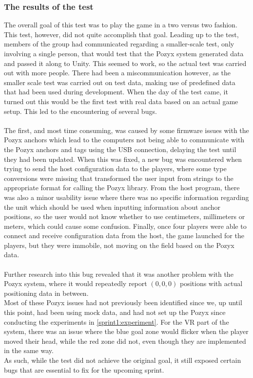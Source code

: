 \subsubsection{The results of the test}
The overall goal of this test was to play the game in a two versus two fashion.
This test, however, did not quite accomplish that goal.
Leading up to the test, members of the group had communicated regarding a smaller-scale test, only involving a single person, that would test that the Pozyx system generated data and passed it along to Unity.
This seemed to work, so the actual test was carried out with more people.
There had been a miscommunication however, as the smaller scale test was carried out on test data, making use of predefined data that had been used during development.
When the day of the test came, it turned out this would be the first test with real data based on an actual game setup.
This led to the encountering of several bugs.
\\\\
The first, and most time consuming, was caused by some firmware issues with the Pozyx anchors which lead to the computers not being able to communicate with the Pozyx anchors and tags using the USB connection, delaying the test until they had been updated.
When this was fixed, a new bug was encountered when trying to send the host configuration data to the players, where some type conversions were missing that transformed the user input from strings to the appropriate format for calling the Pozyx library.
From the host program, there was also a minor usability issue where there was no specific information regarding the unit which should be used when inputting information about anchor positions, so the user would not know whether to use centimeters, millimeters or meters, which could cause some confusion.
Finally, once four players were able to connect and receive configuration data from the host, the game launched for the players, but they were immobile, not moving on the field based on the Pozyx data.
\\\\
Further research into this bug revealed that it was another problem with the Pozyx system, where it would repeatedly report $(0,0,0)$ positions with actual positioning data in between.\\
Most of these Pozyx issues had not previously been identified since we, up until this point, had been using mock data, and had not set up the Pozyx since conducting the experiments in \autoref{sprint1:experiment}.
For the VR part of the system, there was an issue where the blue goal zone would flicker when the player moved their head, while the red zone did not, even though they are implemented in the same way.\\
As such, while the test did not achieve the original goal, it still exposed certain bugs that are essential to fix for the upcoming sprint.

